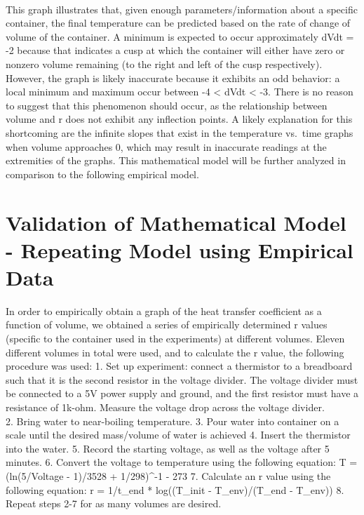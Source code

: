 \documentclass[11pt]{article}
\begin{document}
    \begin{center}
    \end{center}
    { \hspace*{\fill} \\}
    
    This graph illustrates that, given enough parameters/information about a
specific container, the final temperature can be predicted based on the
rate of change of volume of the container. A minimum is expected to
occur approximately dVdt = -2 because that indicates a cusp at which the
container will either have zero or nonzero volume remaining (to the
right and left of the cusp respectively). However, the graph is likely
inaccurate because it exhibits an odd behavior: a local minimum and
maximum occur between -4 \textless{} dVdt \textless{} -3. There is no
reason to suggest that this phenomenon should occur, as the relationship
between volume and r does not exhibit any inflection points. A likely
explanation for this shortcoming are the infinite slopes that exist in
the temperature vs.~time graphs when volume approaches 0, which may
result in inaccurate readings at the extremities of the graphs. This
mathematical model will be further analyzed in comparison to the
following empirical model.

    \hypertarget{validation-of-mathematical-model---repeating-model-using-empirical-data}{%
\section{Validation of Mathematical Model - Repeating Model using
Empirical
Data}\label{validation-of-mathematical-model---repeating-model-using-empirical-data}}

    In order to empirically obtain a graph of the heat transfer coefficient
as a function of volume, we obtained a series of empirically determined
r values (specific to the container used in the experiments) at
different volumes. Eleven different volumes in total were used, and to
calculate the r value, the following procedure was used: 1. Set up
experiment: connect a thermistor to a breadboard such that it is the
second resistor in the voltage divider. The voltage divider must be
connected to a 5V power supply and ground, and the first resistor must
have a resistance of 1k-ohm. Measure the voltage drop across the voltage
divider.\\
2. Bring water to near-boiling temperature. 3. Pour water into container
on a scale until the desired mass/volume of water is achieved 4. Insert
the thermistor into the water. 5. Record the starting voltage, as well
as the voltage after 5 minutes. 6. Convert the voltage to temperature
using the following equation: T = (ln(5/Voltage - 1)/3528 + 1/298)\^{}-1
- 273 7. Calculate an r value using the following equation: r = 1/t\_end
* log((T\_init - T\_env)/(T\_end - T\_env)) 8. Repeat steps 2-7 for as
many volumes are desired.
\end{document}
